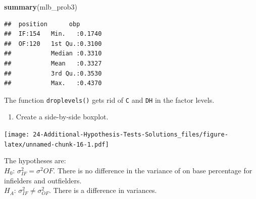 \documentclass[
]{book}
\newenvironment{Shaded}{\begin{snugshade}}{\end{snugshade}}
\newcommand{\KeywordTok}[1]{\textcolor[rgb]{0.13,0.29,0.53}{\textbf{#1}}}
\newcommand{\NormalTok}[1]{#1}
\newcommand{\OperatorTok}[1]{\textcolor[rgb]{0.81,0.36,0.00}{\textbf{#1}}}
\newcommand{\StringTok}[1]{\textcolor[rgb]{0.31,0.60,0.02}{#1}}
\providecommand{\tightlist}{%
  \setlength{\itemsep}{0pt}\setlength{\parskip}{0pt}}
\begin{document}
\begin{Shaded}
\end{Shaded}

\begin{Shaded}
\begin{Highlighting}[]
\KeywordTok{summary}\NormalTok{(mlb_prob3)}
\end{Highlighting}
\end{Shaded}

\begin{verbatim}
##  position      obp        
##  IF:154   Min.   :0.1740  
##  OF:120   1st Qu.:0.3100  
##           Median :0.3310  
##           Mean   :0.3327  
##           3rd Qu.:0.3530  
##           Max.   :0.4370
\end{verbatim}

The function \texttt{droplevels()} gets rid of \texttt{C} and \texttt{DH} in the factor levels.

\begin{enumerate}
\def\labelenumi{\alph{enumi}.}
\setcounter{enumi}{1}
\tightlist
\item
  Create a side-by-side boxplot.
\end{enumerate}

\begin{Shaded}
\end{Shaded}

\texttt{[image: 24-Additional-Hypothesis-Tests-Solutions\_files/figure-latex/unnamed-chunk-16-1.pdf]}

The hypotheses are:\\
\(H_0\): \(\sigma^2_{IF}=\sigma^2{OF}\). There is no difference in the variance of on base percentage for infielders and outfielders.\\
\(H_A\): \(\sigma^2_{IF}\neq \sigma^2_{OF}\). There is a difference in variances.
\end{document}
